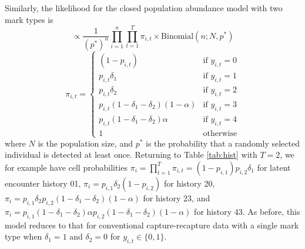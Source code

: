 \documentclass[12pt]{article}
\begin{document}
Similarly, the likelihood for the closed population abundance model with two mark types is
\begin{equation}
  [ {\bf Y} \mid {\bf p}, {\boldsymbol \delta}, \alpha, N ] \propto \frac{1}{\left( p^* \right)^n}\prod_{i=1}^{n} \prod_{t=1}^T \pi_{i,t} \times \text{Binomial} \left(n; N, p^* \right)
  \label{eq:closedlike}
\end{equation}
\begin{equation*}
  \pi_{i,t} = \begin{cases}
                \left( 1-p_{i,t} \right) & \text{if } y_{i,t}=0\\
                p_{i,t} \delta_1  & \text{if } y_{i,t}=1\\
                p_{i,t} \delta_2  & \text{if } y_{i,t}=2\\
                p_{i,t} \left( 1 - \delta_1 - \delta_2 \right) \left( 1 - \alpha \right) & \text{if } y_{i,t}=3\\
                p_{i,t} \left( 1 - \delta_1 - \delta_2 \right) \alpha & \text{if } y_{i,t}=4\\
                1 & \text{otherwise}
              \end{cases}
\end{equation*}
where $N$ is the population size, and $p^*$ is the probability that a randomly selected individual is detected at least once. Returning to Table \ref{tab:hist} with $T=2$, we for example have cell probabilities $\pi_i=\prod_{t=1}^T \pi_{i,t}=\left(1-p_{i,1}\right) p_{i,2} \delta_1$ for latent encounter history 01, $\pi_i= p_{i,1} \delta_2 \left(1-p_{i,2}\right)$ for history 20, $\pi_i=p_{i,1} \delta_2 p_{i,2} \left(1-\delta_1-\delta_2\right) \left(1-\alpha\right)$ for history 23, and $\pi_i=p_{i,1} \left(1-\delta_1-\delta_2\right) \alpha p_{i,2} \left(1-\delta_1-\delta_2\right) \left(1-\alpha\right)$ for history 43. As before, this model reduces to that for conventional capture-recapture data with a single mark type when $\delta_1=1$ and $\delta_2=0$ for $y_{i,t} \in \{0,1\}$. 
\end{document}
